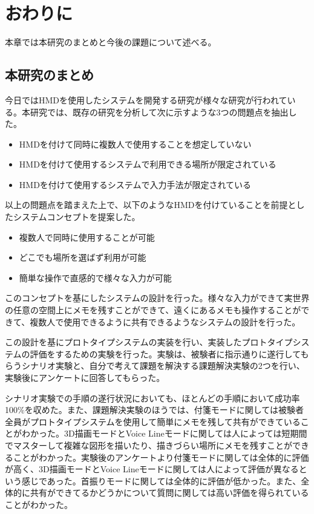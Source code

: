 \documentclass[11pt,a4j, titlepage]{jarticle} %
\begin{document}
\newpage
\section{おわりに}
本章では本研究のまとめと今後の課題について述べる。

\subsection{本研究のまとめ}
今日ではHMDを使用したシステムを開発する研究が様々な研究が行われている。本研究では、既存の研究を分析して次に示すような3つの問題点を抽出した。

\begin{itemize}
	\item HMDを付けて同時に複数人で使用することを想定していない
        \item HMDを付けて使用するシステムで利用できる場所が限定されている
	\item HMDを付けて使用するシステムで入力手法が限定されている
\end{itemize}

以上の問題点を踏まえた上で、以下のようなHMDを付けていることを前提としたシステムコンセプトを提案した。

\begin{itemize}
	\item 複数人で同時に使用することが可能
        \item どこでも場所を選ばず利用が可能
	\item 簡単な操作で直感的で様々な入力が可能
\end{itemize}

このコンセプトを基にしたシステムの設計を行った。様々な入力ができて実世界の任意の空間上にメモを残すことができて、遠くにあるメモも操作することができて、複数人で使用できるように共有できるようなシステムの設計を行った。

この設計を基にプロトタイプシステムの実装を行い、実装したプロトタイプシステムの評価をするための実験を行った。実験は、被験者に指示通りに遂行してもらうシナリオ実験と、自分で考えて課題を解決する課題解決実験の2つを行い、実験後にアンケートに回答してもらった。

シナリオ実験での手順の遂行状況においても、ほとんどの手順において成功率100\%を収めた。また、課題解決実験のほうでは、付箋モードに関しては被験者全員がプロトタイプシステムを使用して簡単にメモを残して共有ができていることがわかった。3D描画モードとVoice Lineモードに関しては人によっては短期間でマスターして複雑な図形を描いたり、描きづらい場所にメモを残すことができることがわかった。実験後のアンケートより付箋モードに関しては全体的に評価が高く、3D描画モードとVoice Lineモードに関しては人によって評価が異なるという感じであった。首振りモードに関しては全体的に評価が低かった。また、全体的に共有ができてるかどうかについて質問に関しては高い評価を得られていることがわかった。
\end{document}
